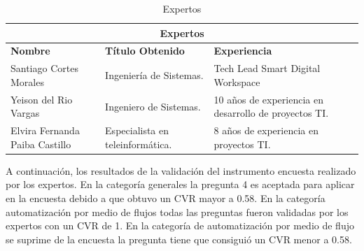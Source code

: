 \begin{table}[H]
	\centering
	\begin{tabular}{|p{4cm}|p{3cm}|p{4cm} |}
		\hline
		\multicolumn{3}{|c|}{Expertos} \\
		\hline
		\textbf{Nombre}& \textbf{Título Obtenido}&\textbf{Experiencia}\\
		\hline
		{\small Santiago Cortes Morales } & {\small Ingeniería de Sistemas.} & {\small Tech Lead Smart Digital Workspace } \\
		
		\hline
		{\small Yeison del Rio Vargas } & {\small Ingeniero de Sistemas.} & {\small 10 años de experiencia en desarrollo de proyectos TI. } \\
		
		\hline
		{\small Elvira Fernanda Paiba Castillo } & {\small Especialista en teleinformática.} & {\small 8 años de experiencia en proyectos TI. } \\
		\hline
		
		
	\end{tabular}
	\caption{Expertos}
	\label{tabla:expertos}
\end{table}

A continuación, los resultados de la validación del instrumento encuesta realizado por los expertos. En la categoría generales la pregunta 4 es aceptada para aplicar en la encuesta debido a que obtuvo un CVR mayor a 0.58. En la categoría automatización por medio de flujos todas las preguntas fueron validadas por los expertos con un CVR de 1. En la categoría de automatización por medio de flujo se suprime de la encuesta la pregunta tiene que consiguió un CVR menor a 0.58.

